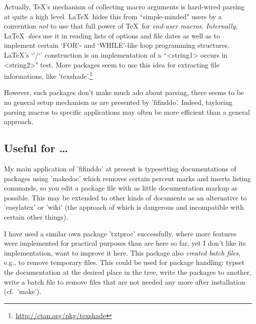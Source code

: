\documentclass{article}
\begin{document}
Actually, \TeX's mechanism of collecting macro arguments is hard-wired 
parsing at quite a high level. \LaTeX\ hides this from 
``simple-minded" users by a convention \emph{not} to use that full 
power of \TeX\ for \emph{end-user macros}. 
\emph{Internally}, \LaTeX\ \emph{does} use it in reading 
lists of options and file dates as well as to implement certain 
`FOR'- and `WHILE'-like loop programming structures. 
\LaTeX's `\in@'/`\ifin@' construction is an implementation of a 
``<string1> occurs in <string2>" test. More packages seem to use 
this idea for extracting file informations, like 
'texshade'.\footnote{\url{http://ctan.org/pkg/texshade}} 


However, such packages don't make much ado about parsing, 
there seems to be no general setup mechanism as are presented by 
'fifinddo'. Indeed, tayloring parsing macros to specific applications 
may often be more efficient than a general approach. 

\subsection{Useful for \dots}
My main application of 'fifinddo' at present is typesetting 
documentations of packages using 'makedoc' which removes certain 
percent marks and inserts listing commands, so you edit a package file 
with as little documentation markup as possible. 
This may be extended to other kinds of documents as an alternative 
to 'easylatex' or 'wiki' (the approach of which is dangerous and 
incompatible with certain other things).

I have used a similar own package 'txtproc' successfully, 
where more features were implemented for practical purposes 
than are here so far, yet I don't like its implementation, want to 
improve it here. This package also \emph{created batch files}, e.g., 
to remove temporary files.
This could be used for package handling: 
typset the documentation at the desired place in the tree, 
write the packages to another, write a batch file to remove 
files that are not needed any more after installation
(cf.\ 'make'). %
\end{document}
